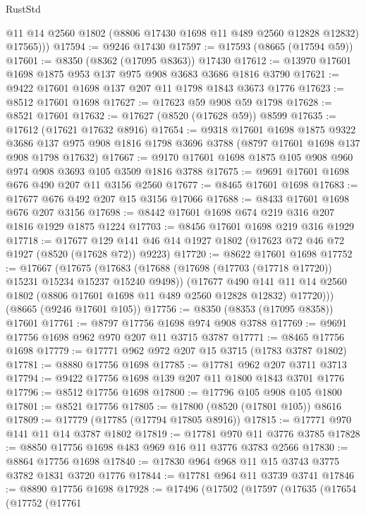 \begin{lexlean}{RustStd}
\begin{coremodule}
          @11
          @14
          @2560
          @1802
          (@8806 @17430 @1698 @11 @489 @2560 @12828 @12832)
          @17565)))
@17594 := @9246 @17430
@17597 := @17593 (@8665 (@17594 @59))
@17601 := @8350 (@8362 (@17095 @8363)) @17430
@17612 := @13970 @17601 @1698 @1875 @953 @137 @975 @908 @3683 @3686 @1816 @3790
@17621 := @9422 @17601 @1698 @137 @207 @11 @1798 @1843 @3673 @1776
@17623 := @8512 @17601 @1698
@17627 := @17623 @59 @908 @59 @1798
@17628 := @8521 @17601
@17632 := @17627 (@8520 (@17628 @59)) @8599
@17635 := @17612 (@17621 @17632 @8916)
@17654 := @9318
    @17601
    @1698
    @1875
    @9322
    @3686
    @137
    @975
    @908
    @1816
    @1798
    @3696
    @3788
    (@8797 @17601 @1698 @137 @908 @1798 @17632)
@17667 := @9170 @17601 @1698 @1875 @105 @908 @960 @974 @908 @3693 @105 @3509 @1816 @3788
@17675 := @9691 @17601 @1698 @676 @490 @207 @11 @3156 @2560
@17677 := @8465 @17601 @1698
@17683 := @17677 @676 @492 @207 @15 @3156 @17066
@17688 := @8433 @17601 @1698 @676 @207 @3156
@17698 := @8442 @17601 @1698 @674 @219 @316 @207 @1816 @1929 @1875 @1224
@17703 := @8456 @17601 @1698 @219 @316 @1929
@17718 := @17677 @129 @141 @46 @14 @1927 @1802 (@17623 @72 @46 @72 @1927 (@8520 (@17628 @72)) @9223)
@17720 := @8622 @17601 @1698
@17752 := @17667
    (@17675
      (@17683
        (@17688 (@17698 (@17703 (@17718 @17720)) @15231 @15234 @15237 @15240 @9498))
        (@17677
          @490
          @141
          @11
          @14
          @2560
          @1802
          (@8806 @17601 @1698 @11 @489 @2560 @12828 @12832)
          @17720)))
    (@8665 (@9246 @17601 @105))
@17756 := @8350 (@8353 (@17095 @8358)) @17601
@17761 := @8797 @17756 @1698 @974 @908 @3788
@17769 := @9691 @17756 @1698 @962 @970 @207 @11 @3715 @3787
@17771 := @8465 @17756 @1698
@17779 := @17771 @962 @972 @207 @15 @3715 (@1783 @3787 @1802)
@17781 := @8880 @17756 @1698
@17785 := @17781 @962 @207 @3711 @3713
@17794 := @9422 @17756 @1698 @139 @207 @11 @1800 @1843 @3701 @1776
@17796 := @8512 @17756 @1698
@17800 := @17796 @105 @908 @105 @1800
@17801 := @8521 @17756
@17805 := @17800 (@8520 (@17801 @105)) @8616
@17809 := @17779 (@17785 (@17794 @17805 @8916))
@17815 := @17771 @970 @141 @11 @14 @3787 @1802
@17819 := @17781 @970 @11 @3776 @3785
@17828 := @8850 @17756 @1698 @483 @969 @16 @11 @3776 @3783 @2566
@17830 := @8864 @17756 @1698
@17840 := @17830 @964 @968 @11 @15 @3743 @3775 @3782 @1831 @3720 @1776
@17844 := @17781 @964 @11 @3739 @3741
@17846 := @8890 @17756 @1698
@17928 := @17496
    (@17502
      (@17597
        (@17635
          (@17654
            (@17752
              (@17761

\end{coremodule}
\end{lexlean}
